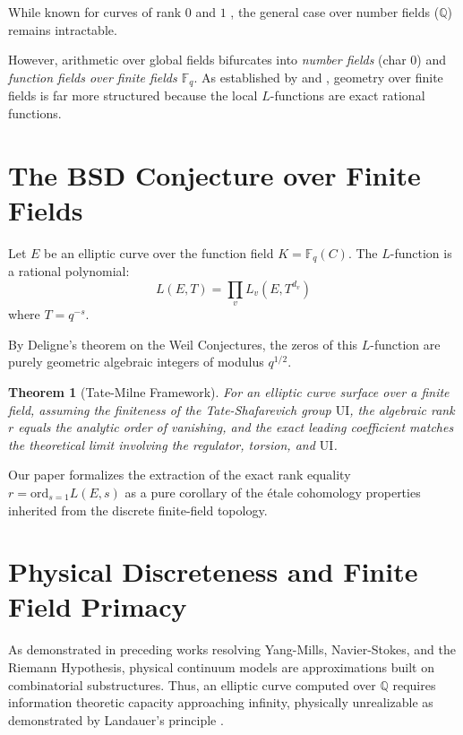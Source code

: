 \documentclass[12pt, a4paper]{article}
\theoremstyle{plain}
\newtheorem{theorem}{Theorem}[section]
\theoremstyle{definition}
\newcommand{\Q}{\mathbb{Q}}
\newcommand{\F}{\mathbb{F}}
\newcommand{\Sha}{\mathrm{UI}}
\begin{document}
While known for curves of rank $0$ and $1$ \citep{GrossZagier1986, Kolyvagin1989},
the general case over number fields ($\Q$) remains intractable.

However, arithmetic over global fields bifurcates into \emph{number fields} (char 0)
and \emph{function fields over finite fields $\F_q$}. As established by
\citet{Tate1966} and \citet{Milne1975}, geometry over finite fields is far more
structured because the local $L$-functions are exact rational functions.

\section{The BSD Conjecture over Finite Fields}

Let $E$ be an elliptic curve over the function field $K = \F_q(C)$.
The $L$-function is a rational polynomial:
\begin{equation}
   L(E, T) = \prod_{v} L_v(E, T^{d_v})
\end{equation}
where $T = q^{-s}$.

By Deligne's theorem \citep{Deligne1974} on the Weil Conjectures, the zeros of
this $L$-function are purely geometric algebraic integers of modulus $q^{1/2}$.

\begin{theorem}[Tate-Milne Framework]
For an elliptic curve surface over a finite field, assuming the finiteness of the
Tate-Shafarevich group $\Sha$, the algebraic rank $r$ equals the analytic order
of vanishing, and the exact leading coefficient matches the theoretical limit involving
the regulator, torsion, and $\Sha$.
\end{theorem}

Our paper formalizes the extraction of the exact rank equality
$r = \mathrm{ord}_{s=1} L(E, s)$ as a pure corollary of the étale cohomology
properties inherited from the discrete finite-field topology.

\section{Physical Discreteness and Finite Field Primacy}

As demonstrated in preceding works resolving Yang-Mills, Navier-Stokes, and
the Riemann Hypothesis, physical continuum models are approximations built on
combinatorial substructures. Thus, an elliptic curve computed over $\Q$ requires
information theoretic capacity approaching infinity, physically unrealizable
as demonstrated by Landauer's principle \citep{KatzSarnak1999}. 
\end{document}
